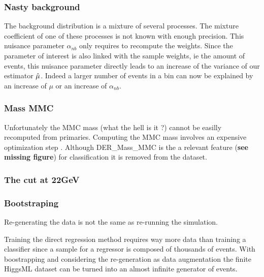 \subsubsection{Nasty background} %
\label{ssub:nasty_background}

The background distribution is a mixture of several processes.
The mixture coefficient of one of these processes is not known with enough precision.
This nuisance parameter $\alpha_{nb}$ only requires to recompute the weights.
Since the parameter of interest is also linked with the sample weights, ie the amount of events, this nuisance parameter directly leads to an increase of the variance of our estimator $\hat\mu$.
Indeed a larger number of events in a bin can now be explained by an increase of $\mu$ or an increase of $\alpha_{nb}$.




\subsubsection{Mass MMC} %
\label{ssub:mass_mmc}

Unfortunately the MMC mass (what the hell is it ?) cannot be easilly recomputed from primaries.
Computing the MMC mass involves an expensive optimization step .
Although DER\_Mass\_MMC is the a relevant feature (\textbf{see missing figure}) for classification it is removed from the dataset.





\subsubsection{The cut at 22GeV} %
\label{ssub:the_cut}






\subsubsection{Bootstraping} %
\label{ssub:boostraping}


Re-generating the data is not the same as re-running the simulation.

Training the direct regression method requires way more data than training a classifier since a sample for a regressor is composed of thousands of events.
With boostrapping and considering the re-generation as data augmentation the finite HiggsML dataset can be turned into an almost infinite generator of events.







